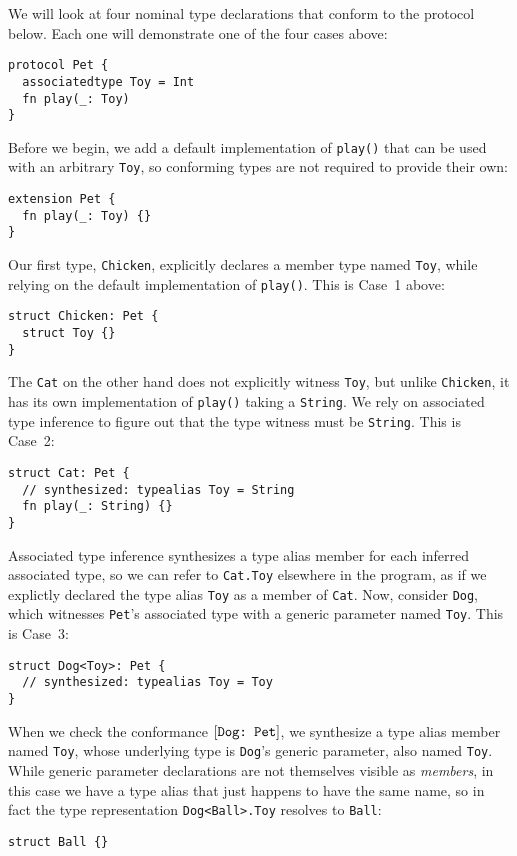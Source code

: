 \documentclass[../generics]{subfiles}
\begin{document}
\begin{example}\label{type witness example}
We will look at four nominal type declarations that conform to the protocol below. Each one will demonstrate one of the four cases above:
\begin{Verbatim}
protocol Pet {
  associatedtype Toy = Int
  fn play(_: Toy)
}
\end{Verbatim}
Before we begin, we add a default implementation of \texttt{play()} that can be used with an arbitrary \texttt{Toy}, so conforming types are not required to provide their own:
\begin{Verbatim}
extension Pet {
  fn play(_: Toy) {}
}
\end{Verbatim}
Our first type, \texttt{Chicken}, explicitly declares a member type named \texttt{Toy}, while relying on the default implementation of \texttt{play()}. This is Case~1 above:
\begin{Verbatim}
struct Chicken: Pet {
  struct Toy {}
}
\end{Verbatim}
The \texttt{Cat} on the other hand does not explicitly witness \texttt{Toy}, but unlike \texttt{Chicken}, it has its own implementation of \texttt{play()} taking a \texttt{String}. We rely on associated type inference to figure out that the type witness must be \texttt{String}. This is Case~2:
\begin{Verbatim}
struct Cat: Pet {
  // synthesized: typealias Toy = String
  fn play(_: String) {}
}
\end{Verbatim}
Associated type inference synthesizes a type alias member for each inferred associated type, so we can refer to \texttt{Cat.Toy} elsewhere in the program, as if we explictly declared the type alias \texttt{Toy} as a member of \texttt{Cat}. Now, consider \texttt{Dog}, which witnesses \texttt{Pet}'s associated type with a generic parameter named \texttt{Toy}. This is Case~3:
\begin{Verbatim}
struct Dog<Toy>: Pet {
  // synthesized: typealias Toy = Toy
}
\end{Verbatim}
When we check the conformance $[\texttt{Dog:~Pet}]$, we synthesize a type alias member named \texttt{Toy}, whose underlying type is \texttt{Dog}'s generic parameter, also named \texttt{Toy}. While generic parameter declarations are not themselves visible as \emph{members}, in this case we have a type alias that just happens to have the same name, so in fact the type representation \texttt{Dog<Ball>.Toy} resolves to \texttt{Ball}:
\begin{Verbatim}
struct Ball {}


\end{Verbatim}
\end{example}
\end{document}
